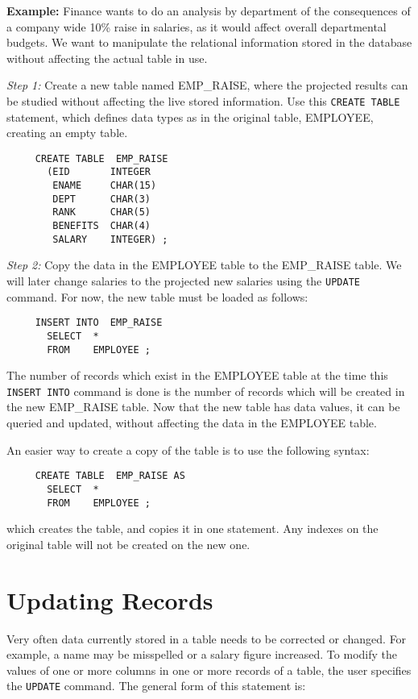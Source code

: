 {\bf Example:}
Finance wants to do an analysis by department of the consequences of a
company wide 10\% raise in salaries, as it would affect overall
departmental budgets.  We want to manipulate the relational
information stored in the database without affecting the actual table
in use.

{\em Step 1:} Create a new table named EMP\_RAISE, where the projected
results can be studied without affecting the live stored information.
Use this {\tt CREATE TABLE} statement, which defines data types as in the
original table, EMPLOYEE, creating an empty table.

\begin{verbatim}
     CREATE TABLE  EMP_RAISE
       (EID       INTEGER
        ENAME     CHAR(15)
        DEPT      CHAR(3)
        RANK      CHAR(5)
        BENEFITS  CHAR(4)
        SALARY    INTEGER) ;
\end{verbatim}

{\em Step 2:} Copy the data in the EMPLOYEE table to the EMP\_RAISE
table.  We will later change salaries to the projected new salaries
using the \verb`UPDATE` command.  For now, the new table must be loaded as
follows:

\begin{verbatim}
     INSERT INTO  EMP_RAISE
       SELECT  *
       FROM    EMPLOYEE ;
\end{verbatim}

The number of records which exist in the EMPLOYEE table at the time
this {\tt INSERT INTO} command is done is the number of records which will
be created in the new EMP\_RAISE table.  Now that the new table has
data values, it can be queried and updated, without affecting the data
in the EMPLOYEE table.

An easier way to create a copy of the table is to use the following
syntax:

\begin{verbatim}
     CREATE TABLE  EMP_RAISE AS
       SELECT  *
       FROM    EMPLOYEE ;
\end{verbatim}

which creates the table, and copies it in one statement.  Any indexes
on the original table will not be created on the new one.

\section{Updating Records}

Very often data currently stored in a table needs to be corrected or
changed.  For example, a name may be misspelled or a salary figure
increased.  To modify the values of one or more columns in one or more
records of a table, the user specifies the \verb`UPDATE` command.  The
general form of this statement is:

